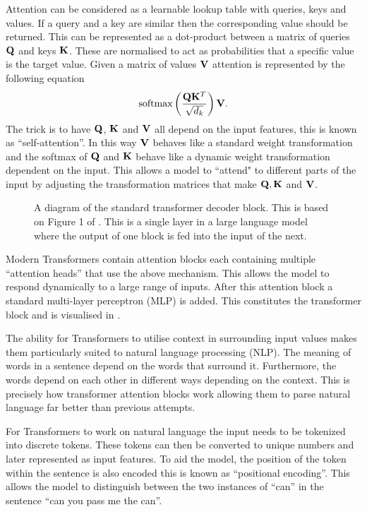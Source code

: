 Attention can be considered as a learnable lookup table with queries, keys and values.
If a query and a key are similar then the corresponding value should be returned.
This can be represented as a dot-product between a matrix of queries $\mathbf{Q}$ and keys $\mathbf{K}$.
These are normalised to act as probabilities that a specific value is the target value.
Given a matrix of values $\mathbf{V}$ attention is represented by the following equation
\begin{equation*}
    \text{softmax}\left(\frac{\mathbf{Q}\mathbf{K}^T}{\sqrt{d_k}}\right)\mathbf{V}.
\end{equation*}
The trick is to have $\mathbf{Q}$, $\mathbf{K}$ and $\mathbf{V}$ all depend on the input features, this is known as ``self-attention''.
In this way $\mathbf{V}$ behaves like a standard weight transformation and the softmax of $\mathbf{Q}$ and $\mathbf{K}$ behave like a dynamic weight transformation dependent on the input.
This allows a model to ``attend" to different parts of the input by adjusting the transformation matrices that make $\mathbf{Q}, \mathbf{K}$ and $\mathbf{V}$.

\begin{figure}
    \centering
    \captionsetup{width=.9\textwidth}
    
    \caption{A diagram of the standard transformer decoder block. This is based on Figure 1 of \citet{transformers}. This is a single layer in a large language model where the output of one block is fed into the input of the next.}
    \label{fig:transformer}
\end{figure}

Modern Transformers contain attention blocks each containing multiple ``attention heads'' that use the above mechanism.
This allows the model to respond dynamically to a large range of inputs.
After this attention block a standard multi-layer perceptron (MLP) is added.
This constitutes the transformer block and is visualised in .

The ability for Transformers to utilise context in surrounding input values makes them particularly suited to natural language processing (NLP).
The meaning of words in a sentence depend on the words that surround it.
Furthermore, the words depend on each other in different ways depending on the context.
This is precisely how transformer attention blocks work allowing them to parse natural language far better than previous attempts.

For Transformers to work on natural language the input needs to be tokenized into discrete tokens.
These tokens can then be converted to unique numbers and later represented as input features.
To aid the model, the position of the token within the sentence is also encoded this is known as ``positional encoding''.
This allows the model to distinguish between the two instances of ``can'' in the sentence ``can you pass me the can''.

